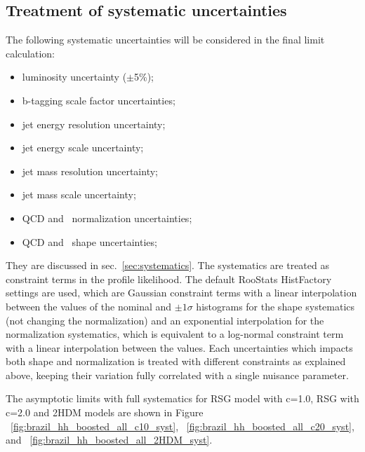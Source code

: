 \subsection{Treatment of systematic uncertainties}
\label{sec:limit_sys}


The following systematic uncertainties will be considered in the final limit calculation:
\begin{itemize}
  \item luminosity uncertainty ($\pm$5\%);
  \item b-tagging scale factor uncertainties;
  \item \largeR jet energy resolution uncertainty;
  \item \largeR jet energy scale uncertainty; 
  \item \largeR jet mass resolution uncertainty;
  \item \largeR jet mass scale uncertainty;
  \item QCD and \ttbar\ normalization uncertainties;
  \item QCD and \ttbar\ shape uncertainties;
\end{itemize}

They are discussed in sec.~\ref{sec:systematics}. The systematics are treated as constraint terms in the profile likelihood. The default RooStats HistFactory settings are used, which are Gaussian constraint terms with a linear interpolation between the values of the nominal and $\pm 1 \sigma$ histograms for the shape systematics (not changing the normalization) and an exponential interpolation for the  normalization systematics,  which is equivalent to a log-normal constraint term with a linear interpolation between the values. Each uncertainties which impacts both shape and normalization is treated with different constraints as explained above, keeping their variation fully correlated with a single nuisance parameter.


The asymptotic limits with full systematics for RSG model with c=1.0, RSG with c=2.0 and 2HDM models are shown in Figure ~\ref{fig:brazil_hh_boosted_all_c10_syst}, ~\ref{fig:brazil_hh_boosted_all_c20_syst}, and ~\ref{fig:brazil_hh_boosted_all_2HDM_syst}.

